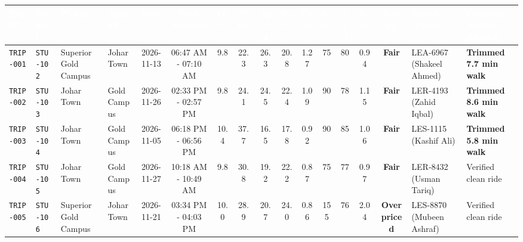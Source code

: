 \documentclass[9pt, a4paper, landscape]{article}
\begin{document}
\begin{table}[h!]
\centering
\fontsize{6.8pt}{8.5pt}\selectfont
\begin{tabularx}{\textwidth}{|l|l|p{2.2cm}|p{2.3cm}|c|c|c|c|c|c|c|c|c|c|c|p{3.1cm}|X|}
\hline
\rowcolor{navyblue}\textcolor{white}{\textbf{Trip ID}} & 
\textcolor{white}{\textbf{Student}} & 
\textcolor{white}{\textbf{Pickup}} & 
\textcolor{white}{\textbf{Dropoff}} & 
\textcolor{white}{\textbf{Date}} & 
\textcolor{white}{\textbf{Time Window}} & 
\textcolor{white}{\textbf{Dist}} & 
\textcolor{white}{\textbf{Time}} & 
\textcolor{white}{\textbf{Speed}} & 
\textcolor{white}{\textbf{Base}} & 
\textcolor{white}{\textbf{Pace}} & 
\textcolor{white}{\textbf{Fare}} & 
\textcolor{white}{\textbf{Std}} & 
\textcolor{white}{\textbf{Ratio}} & 
\textcolor{white}{\textbf{Rating}} & 
\textcolor{white}{\textbf{Vehicle (Driver)}} & 
\textcolor{white}{\textbf{Cleaning Action Applied}} \\ \hline
\rowcolor{white}\texttt{TRIP-001} & \texttt{STU-102} & Superior Gold Campus & Johar Town & 2026-11-13 & 06:47 AM - 07:10 AM & 9.8 & 22.3 & 26.3 & 20.8 & 1.27 & 75 & 80 & 0.94 & \textcolor{accentteal}{\textbf{Fair}} & LEA-6967 (Shakeel Ahmed) & \textcolor{accentblue}{\textbf{Trimmed 7.7 min walk}} \\ \hline
\rowcolor{lightgray}\texttt{TRIP-002} & \texttt{STU-103} & Johar Town & Gold Campus & 2026-11-26 & 02:33 PM - 02:57 PM & 9.8 & 24.1 & 24.5 & 22.4 & 1.09 & 90 & 78 & 1.15 & \textcolor{accentteal}{\textbf{Fair}} & LER-4193 (Zahid Iqbal) & \textcolor{accentblue}{\textbf{Trimmed 8.6 min walk}} \\ \hline
\rowcolor{white}\texttt{TRIP-003} & \texttt{STU-104} & Johar Town & Gold Campus & 2026-11-05 & 06:18 PM - 06:56 PM & 10.4 & 37.7 & 16.5 & 17.8 & 0.92 & 90 & 85 & 1.06 & \textcolor{accentteal}{\textbf{Fair}} & LES-1115 (Kashif Ali) & \textcolor{accentblue}{\textbf{Trimmed 5.8 min walk}} \\ \hline
\rowcolor{lightgray}\texttt{TRIP-004} & \texttt{STU-105} & Johar Town & Gold Campus & 2026-11-27 & 10:18 AM - 10:49 AM & 9.8 & 30.8 & 19.2 & 22.2 & 0.87 & 75 & 77 & 0.97 & \textcolor{accentteal}{\textbf{Fair}} & LER-8432 (Usman Tariq) & \textcolor{slate}{Verified clean ride} \\ \hline
\rowcolor{white}\texttt{TRIP-005} & \texttt{STU-106} & Superior Gold Campus & Johar Town & 2026-11-21 & 03:34 PM - 04:03 PM & 10.0 & 28.9 & 20.7 & 24.0 & 0.86 & 155 & 76 & 2.04 & \textcolor{accentred}{\textbf{Overpriced}} & LES-8870 (Mubeen Ashraf) & \textcolor{slate}{Verified clean ride} \\ \hline

\end{tabularx}
\end{table}
\end{document}
